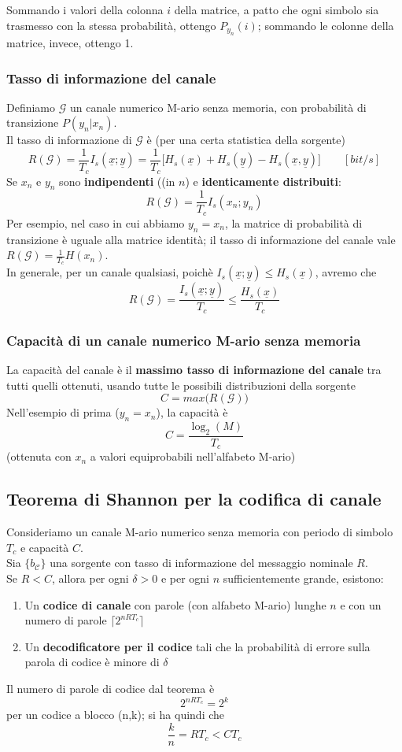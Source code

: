 \documentclass{article}
\begin{document}
Sommando i valori della colonna $i$ della matrice, a patto che ogni simbolo sia trasmesso con la stessa probabilità, ottengo $P_{y_n}(i)$; sommando le colonne della matrice, invece, ottengo 1.\\

\subsubsection{Tasso di informazione del canale}
Definiamo $\mathcal{G}$ un canale numerico M-ario senza memoria, con probabilità di transizione $P(y_n|x_n)$.\\
Il tasso di informazione di $\mathcal{G}$ è (per una certa statistica della sorgente) 
$$R(\mathcal{G})=\frac{1}{T_c}I_s(\underline{x};\underline{y})=\frac{1}{T_c}\big[H_s(\underline{x})+H_s(\underline{y})-H_s(\underline{x},\underline{y})\big]\qquad[bit/s]$$
Se $x_n$ e $y_n$ sono \textbf{indipendenti} ((in $n$) e \textbf{identicamente distribuiti}:
$$R(\mathcal{G})=\frac{1}{T_c}I_s(x_n;y_n)$$
Per esempio, nel caso in cui abbiamo $y_n=x_n$, la matrice di probabilità di transizione è uguale alla matrice identità; il tasso di informazione del canale vale $R(\mathcal{G})=\frac{1}{T_c}H(x_n)$.\\
In generale, per un canale qualsiasi, poichè $I_s(\underline{x};\underline{y})\leq H_s(\underline{x})$, avremo che $$R(\mathcal{G})=\frac{I_s(\underline{x};\underline{y})}{T_c}\leq\frac{H_s(\underline{x})}{T_c}$$

\subsubsection{Capacità di un canale numerico M-ario senza memoria}
La capacità del canale è il \textbf{massimo tasso di informazione del canale} tra tutti quelli ottenuti, usando tutte le possibili distribuzioni della sorgente $$C=max\big(R(\mathcal{G})\big)$$
Nell'esempio di prima ($y_n=x_n$), la capacità è $$C=\frac{\log_2(M)}{T_c}$$ (ottenuta con $x_n$ a valori equiprobabili nell'alfabeto M-ario)

\subsection{Teorema di Shannon per la codifica di canale}
Consideriamo un canale M-ario numerico senza memoria con periodo di simbolo $T_c$ e capacità $C$.\\
Sia $\{b_{\mathcal{C}}\}$ una sorgente con tasso di informazione del messaggio nominale $R$.\\
Se $R<C$, allora per ogni $\delta>0$ e per ogni $n$ sufficientemente grande, esistono:
\begin{enumerate}
	\item Un \textbf{codice di canale} con parole (con alfabeto M-ario) lunghe $n$ e con un numero di parole $\lceil2^{nRT_c}\rceil$
	\item Un \textbf{decodificatore per il codice} tali che la probabilità di errore sulla parola di codice è minore di $\delta$
\end{enumerate}
Il numero di parole di codice dal teorema è $$2^{nRT_c}=2^k$$ per un codice a blocco (n,k); si ha quindi che $$\frac{k}{n}=RT_c<CT_c$$
\end{document}

